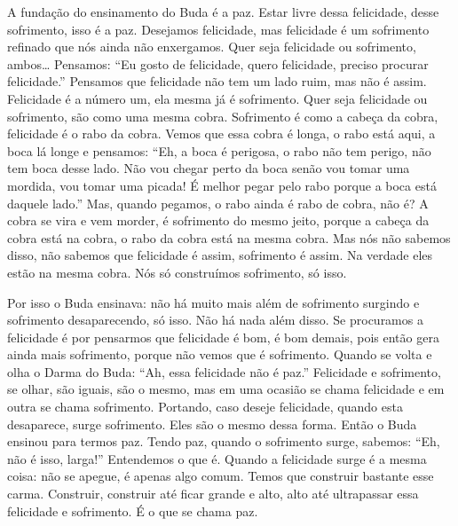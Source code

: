 A fundação do ensinamento do Buda é a paz. Estar livre dessa
felicidade, desse sofrimento, isso é a paz. Desejamos felicidade, mas
felicidade é um sofrimento refinado que nós ainda não enxergamos. Quer
seja felicidade ou sofrimento, ambos\ldots{} Pensamos: “Eu gosto de
felicidade, quero felicidade, preciso procurar felicidade.” Pensamos
que felicidade não tem um lado ruim, mas não é assim. Felicidade é a
número um, ela mesma já é sofrimento. Quer seja felicidade ou
sofrimento, são como uma mesma cobra. Sofrimento é como a cabeça da
cobra, felicidade é o rabo da cobra. Vemos que essa cobra é longa, o
rabo está aqui, a boca lá longe e pensamos: “Eh, a boca é perigosa, o
rabo não tem perigo, não tem boca desse lado. Não vou chegar perto da
boca senão vou tomar uma mordida, vou tomar uma picada! É melhor pegar
pelo rabo porque a boca está daquele lado.” Mas, quando pegamos, o rabo
ainda é rabo de cobra, não é? A cobra se vira e vem morder, é
sofrimento do mesmo jeito, porque a cabeça da cobra está na cobra, o
rabo da cobra está na mesma cobra. Mas nós não sabemos disso, não
sabemos que felicidade é assim, sofrimento é assim. Na verdade eles
estão na mesma cobra. Nós só construímos sofrimento, só isso. 

Por isso o Buda ensinava: não há muito mais além de sofrimento
surgindo e sofrimento desaparecendo, só isso. Não há nada além disso.
Se procuramos a felicidade é por pensarmos que felicidade é bom, é bom
demais, pois então gera ainda mais sofrimento, porque não vemos que é
sofrimento. Quando se volta e olha o Darma do Buda: “Ah, essa
felicidade não é paz.” Felicidade e sofrimento, se olhar, são iguais,
são o mesmo, mas em uma ocasião se chama felicidade e em outra se chama
sofrimento. Portando, caso deseje felicidade, quando esta desaparece,
surge sofrimento. Eles são o mesmo dessa forma. Então o Buda ensinou
para termos paz. Tendo paz, quando o sofrimento surge, sabemos: “Eh,
não é isso, larga!” Entendemos o que é.
Quando a felicidade surge é a mesma coisa: não se apegue, é apenas algo
comum. Temos que construir bastante esse carma. Construir, construir
até ficar grande e alto, alto até ultrapassar essa felicidade e
sofrimento. É o que se chama paz. 

